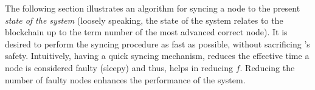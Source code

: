 The following section illustrates an algorithm for syncing a node to the present \emph{state of the system} (loosely speaking, the state of the system relates to the blockchain up to the term number of the most advanced correct node). It is desired to perform the syncing procedure as fast as possible, without sacrificing \nameNS's safety. Intuitively, having a quick syncing mechanism, reduces the effective time a node is considered faulty (sleepy) and thus, helps in reducing $f$. Reducing the number of faulty nodes enhances the performance of the system.



